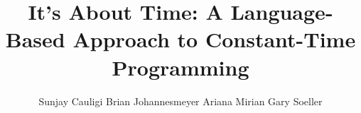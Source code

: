 \documentclass{sig-alternate-10pt}
\begin{document}
\title{It's About Time: A Language-Based Approach to Constant-Time Programming}

\author{
\alignauthor%
Sunjay Cauligi\qquad
Brian Johannesmeyer\qquad
Ariana Mirian\qquad
Gary Soeller\qquad
\smallskip\\\\%
}

\maketitle
\thispagestyle{empty}

\newcommand{\update}[1]{{\color{blue}#1}\xspace}

\newcommand{\twolinecell}[2][r]{%
  \begin{tabular}[#1]{@{}c@{}}#2\end{tabular}}


\pagestyle{plain}
\thispagestyle{empty}












\end{document}
